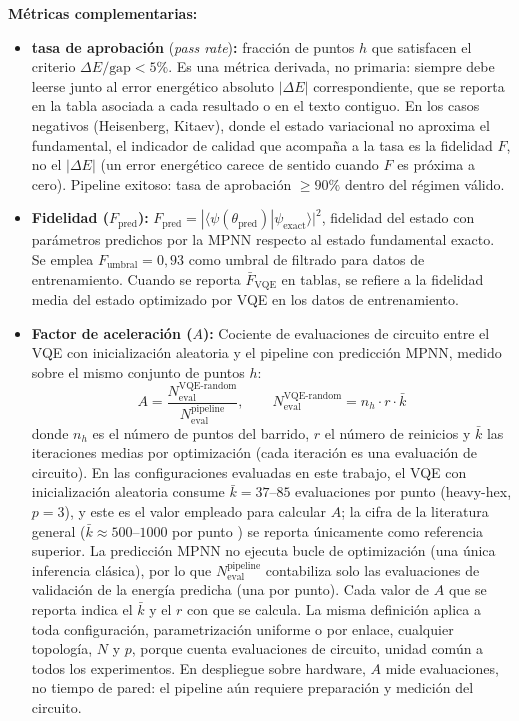 \documentclass[11pt,a4paper,spanish]{book}
\begin{document}
\textbf{Métricas complementarias:}
\begin{itemize}
    \item \textbf{tasa de aprobación} (\emph{pass rate})\textbf{:} fracción de puntos $h$ que satisfacen el criterio $\Delta E/\text{gap} < 5\%$. Es una métrica derivada, no primaria: siempre debe leerse junto al error energético absoluto $|\Delta E|$ correspondiente, que se reporta en la tabla asociada a cada resultado o en el texto contiguo. En los casos negativos (Heisenberg, Kitaev), donde el estado variacional no aproxima el fundamental, el indicador de calidad que acompaña a la tasa es la fidelidad $F$, no el $|\Delta E|$ (un error energético carece de sentido cuando $F$ es próxima a cero). Pipeline exitoso: tasa de aprobación $\geq 90\%$ dentro del régimen válido.
    \item \textbf{Fidelidad ($F_{\text{pred}}$):} $F_{\text{pred}} = |\langle \psi(\theta_{\text{pred}}) | \psi_{\text{exact}} \rangle|^2$, fidelidad del estado con parámetros predichos por la MPNN respecto al estado fundamental exacto. Se emplea $F_{\text{umbral}} = 0,93$ como umbral de filtrado para datos de entrenamiento. Cuando se reporta $\bar{F}_{\text{VQE}}$ en tablas, se refiere a la fidelidad media del estado optimizado por VQE en los datos de entrenamiento.
    \item \textbf{Factor de aceleración ($A$):} Cociente de evaluaciones de circuito entre el VQE con inicialización aleatoria y el pipeline con predicción MPNN, medido sobre el mismo conjunto de puntos $h$:
    \begin{equation}
    A = \frac{N_{\text{eval}}^{\text{VQE-random}}}{N_{\text{eval}}^{\text{pipeline}}}, \qquad N_{\text{eval}}^{\text{VQE-random}} = n_h \cdot r \cdot \bar{k}
    \label{eq:speedup}
    \end{equation}
    donde $n_h$ es el número de puntos del barrido, $r$ el número de reinicios y $\bar{k}$ las iteraciones medias por optimización (cada iteración es una evaluación de circuito). En las configuraciones evaluadas en este trabajo, el VQE con inicialización aleatoria consume $\bar{k} = 37$--$85$ evaluaciones por punto (heavy-hex, $p = 3$), y este es el valor empleado para calcular $A$; la cifra de la literatura general ($\bar{k} \approx 500$--$1000$ por punto \citep{tilly2022}) se reporta únicamente como referencia superior. La predicción MPNN no ejecuta bucle de optimización (una única inferencia clásica), por lo que $N_{\text{eval}}^{\text{pipeline}}$ contabiliza solo las evaluaciones de validación de la energía predicha (una por punto). Cada valor de $A$ que se reporta indica el $\bar{k}$ y el $r$ con que se calcula. La misma definición aplica a toda configuración, parametrización uniforme o por enlace, cualquier topología, $N$ y $p$, porque cuenta evaluaciones de circuito, unidad común a todos los experimentos. En despliegue sobre hardware, $A$ mide evaluaciones, no tiempo de pared: el pipeline aún requiere preparación y medición del circuito.

\end{itemize}
\end{document}
